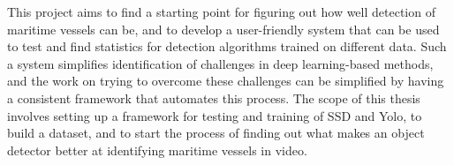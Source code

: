 \vspace{3mm}

This project aims to find a starting point for figuring out how well detection of maritime vessels can be, and to develop a user-friendly system that can be used to test and find statistics for detection algorithms trained on different data. Such a system simplifies identification of challenges in deep learning-based methods, and the work on trying to overcome these challenges can be simplified by having a consistent framework that automates this process. The scope of this thesis involves setting up a framework for testing and training of SSD and Yolo, to build a dataset, and to start the process of finding out what makes an object detector better at identifying maritime vessels in video.


\cleardoublepage